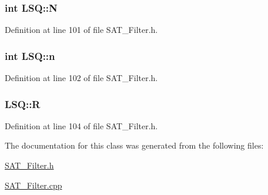 \hypertarget{classLSQ_a65c4ff6465f8226b75a6e067bc05e250}{
\subsubsection[{N}]{\setlength{\rightskip}{0pt plus 5cm}int L\-S\-Q\-::\-N\hspace{0.3cm}{\ttfamily [private]}}}\label{classLSQ_a65c4ff6465f8226b75a6e067bc05e250}


Definition at line 101 of file S\-A\-T\-\_\-\-Filter.\-h.

\hypertarget{classLSQ_a418dee1f166c83e8b6c72dcedae9147c}{
\subsubsection[{n}]{\setlength{\rightskip}{0pt plus 5cm}int L\-S\-Q\-::n\hspace{0.3cm}{\ttfamily [private]}}}\label{classLSQ_a418dee1f166c83e8b6c72dcedae9147c}


Definition at line 102 of file S\-A\-T\-\_\-\-Filter.\-h.

\hypertarget{classLSQ_ae5391f8813e373a0b29224925251098c}{
\subsubsection[{R}]{ L\-S\-Q\-::\-R\hspace{0.3cm}{\ttfamily [private]}}}\label{classLSQ_ae5391f8813e373a0b29224925251098c}


Definition at line 104 of file S\-A\-T\-\_\-\-Filter.\-h.



The documentation for this class was generated from the following files\-:\begin{DoxyCompactItemize}
\item 
\hyperlink{SAT__Filter_8h}{S\-A\-T\-\_\-\-Filter.\-h}\item 
\hyperlink{SAT__Filter_8cpp}{S\-A\-T\-\_\-\-Filter.\-cpp}\end{DoxyCompactItemize}
